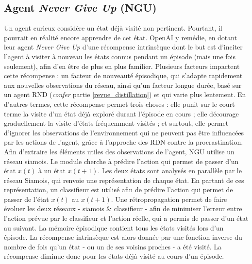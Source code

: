 \documentclass[a4paper,12pt]{report}
\begin{document}
\subsection{Agent \textit{Never Give Up} \cite{ngu} (NGU)}
\indent Un agent curieux considère un état déjà visité non pertinent. Pourtant, il pourrait en réalité encore apprendre de cet état.
\newline \indent OpenAI y remédie, en dotant leur agent \textit{Never Give Up} d’une récompense intrinsèque dont le but est d'inciter l’agent à visiter à nouveau les états connus pendant un épisode (mais une fois seulement), afin d'en être de plus en plus familier.
\newline
\newline \indent Plusieurs facteurs impactent cette récompense : un facteur de nouveauté épisodique, qui s’adapte rapidement aux nouvelles observations du réseau, ainsi qu'un facteur longue durée, basé sur un agent RND (\textit{confer} partie \ref{revue_distillation}) et qui varie plus lentement. En d’autres termes, cette récompense permet trois choses : elle punit sur le court terme la visite d’un état déjà exploré durant l'épisode en cours ; elle décourage graduellement la visite d’états fréquemment visités ; et surtout, elle permet d'ignorer les observations de l’environnement qui ne peuvent pas être influencées par les actions de l’agent, grâce à l'approche des RDN contre la procrastination.
\newline
\newline \indent Afin d'extraire les éléments utiles des observations de l’agent, NGU utilise un réseau siamois. Le module cherche à prédire l’action qui permet de passer d’un état $x(t)$ à un état $x(t+1)$. Les deux états sont analysés en parallèle par le réseau Siamois, qui renvoie une représentation de chaque état.
\newline En partant de ces représentation, un classifieur est utilisé afin de prédire l’action qui permet de passer de l’état $x(t)$ au $x(t+1)$. Une rétropropagation permet de faire évoluer les deux réseaux - siamois \& classifieur - afin de minimiser l’erreur entre l’action prévue par le classifieur et l’action réelle, qui a permis de passer d'un état au suivant.
\newline
\newline \indent  La mémoire épisodique contient tous les états visités lors d'un épisode. La récompense intrinsèque est alors donnée par une fonction inverse du nombre de fois qu’un état - ou un de ses voisins proches - a été visité. La récompense diminue donc pour les états déjà visité au cours d'un épisode.
\end{document}
